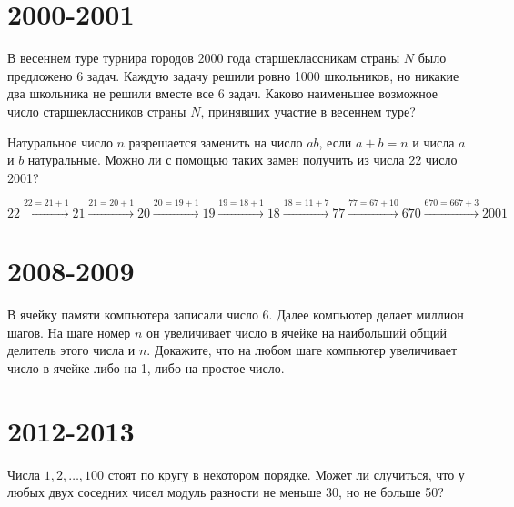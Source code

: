 \documentclass[11pt, a4paper]{template}
\begin{document}
\chapter{2000-2001}

\begin{exercise}
В весеннем туре турнира городов 2000 года старшеклассникам страны $N$ было предложено 6 задач. Каждую задачу решили ровно 1000 школьников, но никакие два школьника не решили вместе все 6 задач. Каково наименьшее возможное число старшеклассников страны $N$, принявших участие в весеннем туре?
\end{exercise}

\begin{exercise}
Натуральное число $n$ разрешается заменить на число $ab$, если $a + b = n$ и числа $a$ и $b$ натуральные. Можно ли с помощью таких замен получить из числа 22 число 2001?
\end{exercise}

\begin{solution}
$$
22 \xrightarrow{22 = 21 + 1} 21 \xrightarrow{21 = 20 + 1} 20 \xrightarrow{20 = 19 + 1} 19 \xrightarrow{19 = 18+1} 18 \xrightarrow {18 = 11 + 7} 77 \xrightarrow{77 = 67 + 10} 670 \xrightarrow{670=667+3} 2001
$$
\end{solution}

\chapter{2008-2009}

\begin{exercise}
В ячейку памяти компьютера записали число 6. Далее компьютер делает миллион шагов. На шаге номер $n$ он увеличивает число в ячейке на наибольший общий делитель этого числа и $n$. Докажите, что на любом шаге компьютер увеличивает число в ячейке либо на 1, либо на простое число.
\end{exercise}

\begin{solution}

\end{solution}

\chapter{2012-2013}

\begin{exercise}
Числа $1, 2, \dots, 100$ стоят по кругу в некотором порядке. Может ли случиться, что у любых двух соседних чисел модуль разности не меньше 30, но не больше 50?
\end{exercise}
\end{document}
